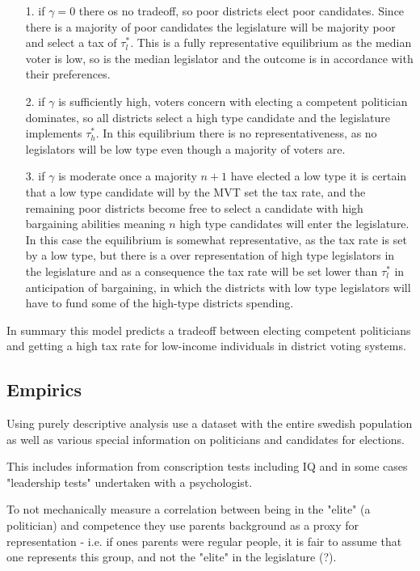 \begin{itemize}
    \item[1.] if $\gamma = 0$ there os no tradeoff, so poor districts elect poor candidates. Since there is a majority of poor candidates the legislature will be majority poor and select a tax of $\tau_l^*$. This is a fully representative equilibrium as the median voter is low, so is the median legislator and the outcome is in accordance with their preferences.
    \item[2.] if $\gamma$ is sufficiently high, voters concern with electing a competent politician dominates, so all districts select a high type candidate and the legislature implements $\tau_h^*$. In this equilibrium there is no representativeness, as no legislators will be low type even though a majority of voters are. 
    \item[3.] if $\gamma$ is moderate once a majority $n+1$ have elected a low type it is certain that a low type candidate will by the MVT set the tax rate, and the remaining poor districts become free to select a candidate with high bargaining abilities meaning $n$ high type candidates will enter the legislature. In this case the equilibrium is somewhat representative, as the tax rate is set by a low type, but there is a over representation of high type legislators in the legislature and as a consequence the tax rate will be set lower than $\tau_l^*$ in anticipation of bargaining, in which the districts with low type legislators will have to fund some of the high-type districts spending. 
\end{itemize} 

In summary this model predicts a tradeoff between electing competent politicians and getting a high tax rate for low-income individuals in district voting systems. 

\subsection{Empirics \citep{dal_bo_who_2017}}
Using purely descriptive analysis \cite{dal_bo_who_2017} use a dataset with the entire swedish population as well as various special information on politicians and candidates for elections.

This includes information from conscription tests including IQ and in some cases "leadership tests" undertaken with a psychologist.

To not mechanically measure a correlation between being in the "elite" (a politician) and competence they use parents background as a proxy for representation - i.e. if ones parents were regular people, it is fair to assume that one represents this group, and not the "elite" in the legislature (?). 


